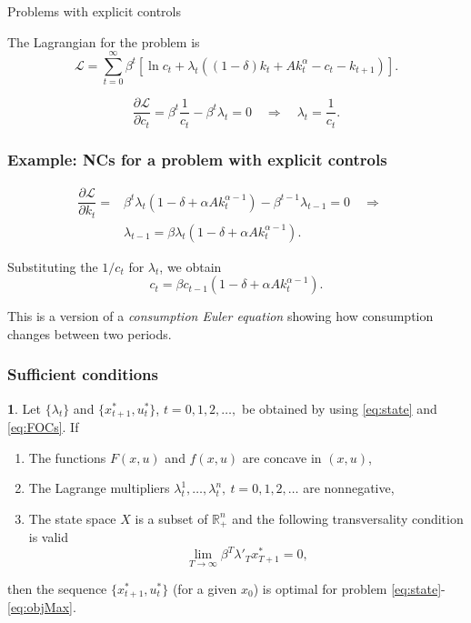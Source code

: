 \documentclass[10pt]{beamer}
\theoremstyle{definition}
\newtheorem{Fact}{\translate{Fact}}
\begin{document}
\begin{section}{Problems with explicit controls}
\begin{frame}[fragile]
The Lagrangian for the problem is \[ \mathcal{L} = \sum_{t=0}^{\infty}\beta^t \left[\ln c_t + \lambda_t ((1-\delta)k_t + Ak_t^\alpha - c_t -k_{t+1}) \right]. \]

\[ \dfrac{\partial \mathcal{L}}{\partial c_t} = \beta^t \dfrac{1}{c_t}- \beta^t \lambda_t = 0 \quad \Rightarrow \quad \lambda_t = \dfrac{1}{c_t}. \]
\end{frame}

\begin{frame}[fragile]
\frametitle{Example: NCs for a problem with explicit controls}
\[\begin{split}
\dfrac{\partial \mathcal{L}}{\partial k_t} =& \beta^t \lambda_t (1-\delta + \alpha A k_t^{\alpha-1}) - \beta^{t-1}\lambda_{t-1} = 0 \quad \Rightarrow \quad \\
&\lambda_{t-1} = \beta \lambda_t (1-\delta + \alpha A k_t^{\alpha-1}).
\end{split} \]

Substituting the $ 1/c_t $ for $ \lambda_t $, we obtain \[ c_t = \beta c_{t-1} (1-\delta + \alpha A k_t^{\alpha-1}). \]

This is a version of a \emph{consumption Euler equation} showing how consumption changes between two periods.%

\end{frame}


\begin{frame}[fragile]
\frametitle{Sufficient conditions}
\begin{Fact} Let $\{\lambda_t\}$ and $\{x^*_{t+1},u^*_t\}$,
$t=0,1,2,\ldots,$ be obtained by using \eqref{eq:state}
and \eqref{eq:FOCs}. If 
	\begin{enumerate}
	\item The functions $F(x,u)$ and $f(x,u)$
	are concave in $(x,u)$,
	\item The Lagrange multipliers $\lambda_t^1,\ldots,\lambda_t^n,
	~t=0,1,2,\ldots$ are nonnegative,
	\item The state space $X$ is a subset of $\mathbb{R}^n_+$ and the following transversality condition is valid $$\lim_{T\rightarrow \infty} \beta^T \lambda'_T 
	x^*_{T+1}=0,$$
	\end{enumerate} 
then the sequence $\{x^*_{t+1},u^*_t\}$ (for a given $x_0$) is optimal for problem  \eqref{eq:state}-\eqref{eq:objMax}.
\label{fc:sufficiency}\end{Fact}
\end{frame}



\end{section}
\end{document}
